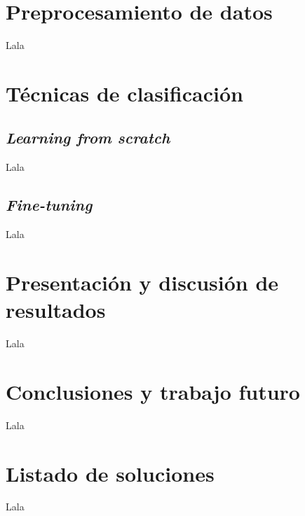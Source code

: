 \section{Preprocesamiento de datos}

Lala

\section{Técnicas de clasificación}

\subsection{\textit{Learning from scratch}}

Lala

\subsection{\textit{Fine-tuning}}

Lala

\section{Presentación y discusión de resultados}

Lala

\section{Conclusiones y trabajo futuro}

Lala

\section{Listado de soluciones}

Lala


\newpage


